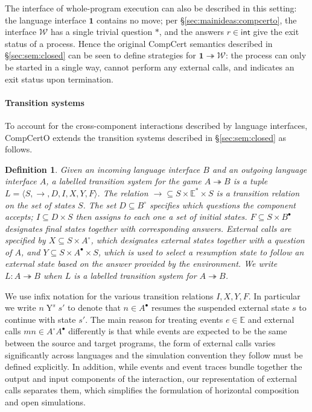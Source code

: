 \documentclass[draft,11pt]{report}
\newtheorem{definition}{Definition}
\newcommand{\kw}[1]{\ensuremath{ \mathsf{#1} }}
\newcommand{\que}{\circ}         %
\newcommand{\ans}{\bullet}       %
\begin{document}
The interface of whole-program execution
can also be described in this setting:
the language interface $\mathbf{1}$ contains no move;
per \S\ref{sec:mainideas:compcerto},
the interface $\mathcal{W}$ has a single trivial question $*$,
and the answers $r \in \kw{int}$
give the exit status of a process.
Hence the original CompCert semantics described in
\S\ref{sec:sem:closed}
can be seen to define strategies for
$\mathbf{1} \twoheadrightarrow \mathcal{W}$:
the process can only be started in a single way,
cannot perform any external calls,
and indicates an exit status upon termination.


\paragraph{Transition systems} %

To account for the cross-component interactions
described by language interfaces,
CompCertO extends
the transition systems described in \S\ref{sec:sem:closed}
as follows.

\begin{definition} \label{def:lts}
Given an \emph{incoming} language interface $B$
and an \emph{outgoing} language interface $A$,
a \emph{labelled transition system for the game $A \twoheadrightarrow B$}
is a tuple $L = \langle S, \rightarrow, D, I, X, Y, F \rangle$.
The relation
${\rightarrow} \subseteq S \times \mathbb{E}^* \times S$ is
a \emph{transition relation} on the set of states $S$.
The set $D \subseteq B^\que$ specifies which
questions the component accepts;
$I \subseteq D \times S$ then
assigns to each one a set of \emph{initial states}.
$F \subseteq S \times B^\ans$
designates \emph{final states} together with corresponding answers.
External calls are specified by
$X \subseteq S \times A^\que$,
which designates \emph{external states} together with
a question of $A$, and
$Y \subseteq S \times A^\ans \times S$,
which is used to select a \emph{resumption state}
to follow an external state
based on the answer provided by the environment.
We write $L : A \twoheadrightarrow B$ when
$L$ is a labelled transition system for $A \twoheadrightarrow B$.
\end{definition}

We use infix notation for the various transition relations
$I, X, Y, F$.
In particular we write $n \mathrel{Y}^s s'$
to denote that $n \in A^\ans$
resumes the suspended external state $s$
to continue with state $s'$.
%
The main reason for treating
events $e \in \mathbb{E}$ and
external calls $m n \in A^\que A^\ans$
differently is that
while events are expected to be the same
between the source and target programs,
the form of external calls varies significantly
across languages
and the simulation convention they follow
must be defined explicitly.
In addition,
while events and event traces
bundle together the output and input
components of the interaction,
our representation of external calls
separates them,
which simplifies the formulation of
horizontal composition and open simulations.
\end{document}
